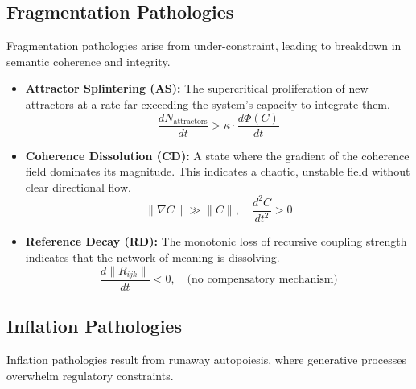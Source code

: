 \subsection{Fragmentation Pathologies}
\label{sec:fragmentation_pathologies}

Fragmentation pathologies arise from under-constraint, leading to breakdown in semantic coherence and integrity.

\begin{itemize}
    \item \textbf{Attractor Splintering (AS):} The supercritical proliferation of new attractors at a rate far exceeding the system's capacity to integrate them.
    \begin{equation}
    \frac{dN_{\text{attractors}}}{dt} > \kappa \cdot \frac{d\Phi(C)}{dt}
    \end{equation}

    \item \textbf{Coherence Dissolution (CD):} A state where the gradient of the coherence field dominates its magnitude. This indicates a chaotic, unstable field without clear directional flow.
    \begin{equation}
    \|\nabla C\| \gg \|C\|, \quad \frac{d^2C}{dt^2} > 0
    \end{equation}

    \item \textbf{Reference Decay (RD):} The monotonic loss of recursive coupling strength indicates that the network of meaning is dissolving.
    \begin{equation}
    \frac{d\|R_{ijk}\|}{dt} < 0, \quad \text{(no compensatory mechanism)}
    \end{equation}
\end{itemize}


\subsection{Inflation Pathologies}
\label{sec:inflation_pathologies}

Inflation pathologies result from runaway autopoiesis, where generative processes overwhelm regulatory constraints.

